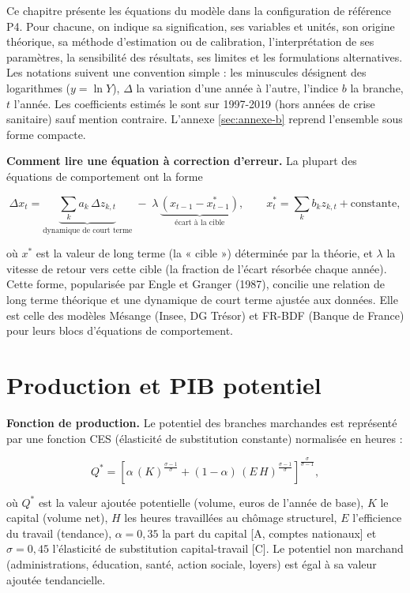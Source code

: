 \documentclass[
  11pt,
  11pt,
  a4paper,
  openany]{book}
\begin{document}
Ce chapitre présente les équations du modèle dans la configuration de
référence P4. Pour chacune, on indique sa signification, ses variables
et unités, son origine théorique, sa méthode d'estimation ou de
calibration, l'interprétation de ses paramètres, la sensibilité des
résultats, ses limites et les formulations alternatives. Les notations
suivent une convention simple : les minuscules désignent des logarithmes
(\(y = \ln Y\)), \(\Delta\) la variation d'une année à l'autre, l'indice
\(b\) la branche, \(t\) l'année. Les coefficients estimés le sont sur
1997-2019 (hors années de crise sanitaire) sauf mention contraire.
L'annexe \ref{sec:annexe-b} reprend l'ensemble sous forme compacte.

\textbf{Comment lire une équation à correction d'erreur.} La plupart des
équations de comportement ont la forme

\[\Delta x_t = \underbrace{\sum_k a_k \,\Delta z_{k,t}}_{\text{dynamique de court terme}}
\;-\; \lambda \,\underbrace{\left(x_{t-1} - x^*_{t-1}\right)}_{\text{écart à la cible}}, \qquad
x^*_t = \sum_k b_k z_{k,t} + \text{constante},\]

où \(x^*\) est la valeur de long terme (la « cible ») déterminée par la
théorie, et \(\lambda\) la vitesse de retour vers cette cible (la
fraction de l'écart résorbée chaque année). Cette forme, popularisée par
Engle et Granger (1987), concilie une relation de long terme théorique
et une dynamique de court terme ajustée aux données. Elle est celle des
modèles Mésange (Insee, DG Trésor) et FR-BDF (Banque de France) pour
leurs blocs d'équations de comportement.

\hypertarget{sec:eq-production}{%
\section{Production et PIB potentiel}\label{sec:eq-production}}

\textbf{Fonction de production.} Le potentiel des branches marchandes
est représenté par une fonction CES (élasticité de substitution
constante) normalisée en heures :

\[Q^* = \left[\alpha\,(K)^{\frac{\sigma-1}{\sigma}} + (1-\alpha)\,(E\,H)^{\frac{\sigma-1}{\sigma}}\right]^{\frac{\sigma}{\sigma-1}},\]

où \(Q^*\) est la valeur ajoutée potentielle (volume, euros de l'année
de base), \(K\) le capital (volume net), \(H\) les heures travaillées au
chômage structurel, \(E\) l'efficience du travail (tendance),
\(\alpha = 0{,}35\) la part du capital {[}A, comptes nationaux{]} et
\(\sigma = 0{,}45\) l'élasticité de substitution capital-travail
{[}C{]}. Le potentiel non marchand (administrations, éducation, santé,
action sociale, loyers) est égal à sa valeur ajoutée tendancielle.
\end{document}

